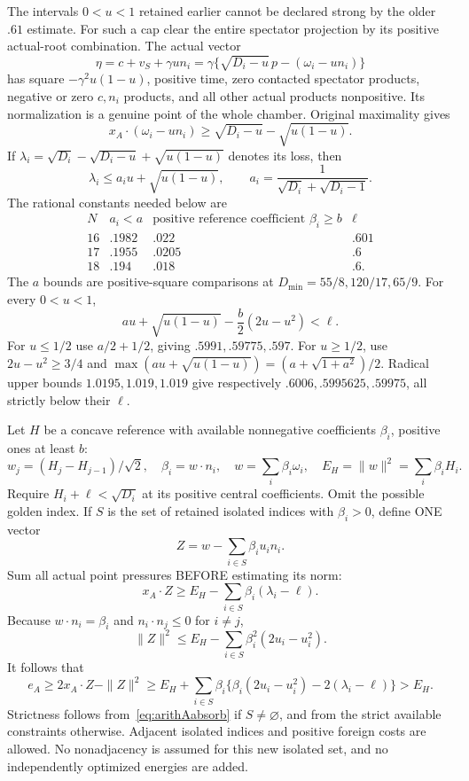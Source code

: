 \documentclass[11pt]{article}
\begin{document}
The intervals \(0<u<1\) retained earlier cannot be declared
strong by the older \(.61\) estimate.
For such a cap clear the entire spectator projection by its
positive actual-root combination.  The actual vector
\[
 \eta=c+v_S+\gamma u n_i
      =\gamma\{\sqrt{D_i-u}\,p-(\omega_i-un_i)\}
\]
has square \(-\gamma^2u(1-u)\), positive time, zero contacted
spectator products, negative or zero \(c,n_i\) products, and
all other actual products nonpositive.
Its normalization is a genuine point of the whole chamber.
Original maximality gives
\[
 x_A\cdot(\omega_i-un_i)
 \ge\sqrt{D_i-u}-\sqrt{u(1-u)}.
\]
If \(\lambda_i=\sqrt{D_i}-\sqrt{D_i-u}+\sqrt{u(1-u)}\)
denotes its loss, then
\[
 \lambda_i\le a_i u+\sqrt{u(1-u)},\qquad
 a_i={\frac{1}{\sqrt{D_i}+\sqrt{D_i-1}}}.
\]
The rational constants needed below are
\[
\begin{array}{c|ccc}
N&a_i<a&\text{positive reference coefficient }\beta_i\ge b&
 \ell\\ \hline
16&.1982&.022&.601\\
17&.1955&.0205&.6\\
18&.194&.018&.6 .
\end{array}
\]
The \(a\) bounds are positive-square comparisons at
\(D_{\min}=55/8,120/17,65/9\).
For every \(0<u<1\),
\[
 a u+\sqrt{u(1-u)}-\frac b2(2u-u^2)<\ell.
\tag{Aabsorb}\label{eq:arithAabsorb}
\]
For \(u\le1/2\) use \(a/2+1/2\), giving
\(.5991,.59775,.597\).
For \(u\ge1/2\), use \(2u-u^2\ge3/4\) and
\(\max(au+\sqrt{u(1-u)})=(a+\sqrt{1+a^2})/2\).
Radical upper bounds \(1.0195,1.019,1.019\) give respectively
\(.6006,.5995625,.59975\), all strictly below their \(\ell\).

Let \(H\) be a concave reference with available nonnegative
coefficients \(\beta_i\), positive ones at least \(b\):
\[
 w_j=(H_j-H_{j-1})/\sqrt2,\quad
 \beta_i=w\cdot n_i,\quad
 w=\sum_i\beta_i\omega_i,\quad
 E_H=\|w\|^2=\sum_i\beta_iH_i .
\]
Require \(H_i+\ell<\sqrt{D_i}\) at its positive central
coefficients.  Omit the possible golden index.
If \(S\) is the set of retained isolated indices with
\(\beta_i>0\), define ONE vector
\[
                       Z=w-\sum_{i\in S}\beta_i u_i n_i .
\]
Sum all actual point pressures BEFORE estimating its norm:
\[
 x_A\cdot Z\ge E_H-\sum_{i\in S}\beta_i(\lambda_i-\ell).
\]
Because \(w\cdot n_i=\beta_i\) and
\(n_i\cdot n_j\le0\) for \(i\ne j\),
\[
 \|Z\|^2\le E_H-\sum_{i\in S}\beta_i^2(2u_i-u_i^2).
\]
It follows that
\[
 e_A\ge2x_A\cdot Z-\|Z\|^2
 \ge E_H+\sum_{i\in S}\beta_i
       \{\beta_i(2u_i-u_i^2)-2(\lambda_i-\ell)\}>E_H.
\tag{Asummed}\label{eq:arithAsummed}
\]
Strictness follows from~\eqref{eq:arithAabsorb} if \(S\ne\varnothing\),
and from the strict available constraints otherwise.
Adjacent isolated indices and positive foreign costs are allowed.
No nonadjacency is assumed for this new isolated set, and no
independently optimized energies are added.
\end{document}
